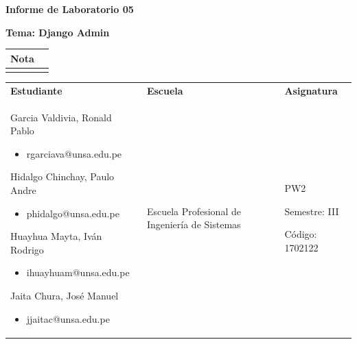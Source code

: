 \documentclass{article}
\newcommand{\itemCourse}{PW2}
\newcommand{\itemCourseCode}{1702122}
\newcommand{\itemSemester}{III}
\newcommand{\itemSchool}{Escuela Profesional de Ingeniería de Sistemas}
\newcommand{\itemPracticeNumber}{05}
\newcommand{\itemTheme}{Django Admin}
\begin{document}
	
	\vspace*{10px}
	
	\begin{center}	
		\fontsize{17}{17} \textbf{ Informe de Laboratorio \itemPracticeNumber}
	\end{center}
	\centerline{\textbf{\Large Tema: \itemTheme}}

	\begin{flushright}
		\begin{tabular}{|M{2.5cm}|N|}
			\hline 
			\color{white} \textbf{Nota}  \\
			\hline 
			     \\[30pt]
			\hline 			
		\end{tabular}
	\end{flushright}	

	\begin{table}[H]
		\begin{tabular}{|x{4.7cm}|x{4.8cm}|x{4.8cm}|}
			\hline 
			\color{white} \textbf{Estudiante} & \color{white}\textbf{Escuela}  & \color{white}\textbf{Asignatura}   \\
Garcia Valdivia, Ronald Pablo
           \begin{itemize}
               \item rgarciava@unsa.edu.pe
           \end{itemize}
Hidalgo Chinchay, Paulo Andre  
           \begin{itemize}
               \item phidalgo@unsa.edu.pe
           \end{itemize}
Huayhua Mayta, Iván Rodrigo
           \begin{itemize}
               \item  ihuayhuam@unsa.edu.pe
           \end{itemize}
Jaita Chura, José Manuel
           \begin{itemize}
               \item jjaitac@unsa.edu.pe 
           \end{itemize}
			 & \itemSchool & {\itemCourse \par Semestre: \itemSemester \par Código: \itemCourseCode}     \\
			\hline 			
		\end{tabular}
	\end{table}		
	
\end{document}
